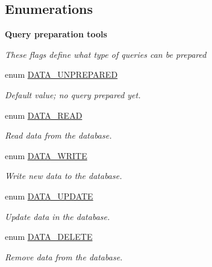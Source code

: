 \subsection*{Enumerations}
\begin{Indent}{\bf Query preparation tools}\par
{\em These flags define what type of queries can be prepared }\begin{CompactItemize}
\item 
enum \hyperlink{class_8datahandler_8php_21c8184f96d445f8f608321e0e8fffc9}{DATA\_\-UNPREPARED} 
\begin{CompactList}\small\item\em Default value; no query prepared yet. \item\end{CompactList}\item 
enum \hyperlink{class_8datahandler_8php_c28f74b49007773d24ca2207baac6d32}{DATA\_\-READ} 
\begin{CompactList}\small\item\em Read data from the database. \item\end{CompactList}\item 
enum \hyperlink{class_8datahandler_8php_5d8b54a2eb4767a05a2e577c2db9193a}{DATA\_\-WRITE} 
\begin{CompactList}\small\item\em Write new data to the database. \item\end{CompactList}\item 
enum \hyperlink{class_8datahandler_8php_9a817a8e9190bfc1eb884f9b4c3cb7c8}{DATA\_\-UPDATE} 
\begin{CompactList}\small\item\em Update data in the database. \item\end{CompactList}\item 
enum \hyperlink{class_8datahandler_8php_b4fa180fa2d24c38e425ff9ca4c913fa}{DATA\_\-DELETE} 
\begin{CompactList}\small\item\em Remove data from the database. \item\end{CompactList}\end{CompactItemize}
\end{Indent}
